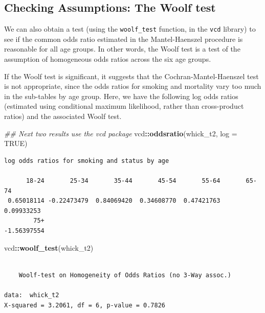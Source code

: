 \documentclass[
]{book}
\newenvironment{Shaded}{\begin{snugshade}}{\end{snugshade}}
\newcommand{\CommentTok}[1]{\textcolor[rgb]{0.56,0.35,0.01}{\textit{#1}}}
\newcommand{\DataTypeTok}[1]{\textcolor[rgb]{0.13,0.29,0.53}{#1}}
\newcommand{\KeywordTok}[1]{\textcolor[rgb]{0.13,0.29,0.53}{\textbf{#1}}}
\newcommand{\NormalTok}[1]{#1}
\newcommand{\OperatorTok}[1]{\textcolor[rgb]{0.81,0.36,0.00}{\textbf{#1}}}
\newcommand{\OtherTok}[1]{\textcolor[rgb]{0.56,0.35,0.01}{#1}}
\begin{document}
\hypertarget{checking-assumptions-the-woolf-test}{%
\subsection{Checking Assumptions: The Woolf test}\label{checking-assumptions-the-woolf-test}}

We can also obtain a test (using the \texttt{woolf\_test} function, in the \texttt{vcd} library) to see if the common odds ratio estimated in the Mantel-Haenszel procedure is reasonable for all age groups. In other words, the Woolf test is a test of the assumption of homogeneous odds ratios across the six age groups.

If the Woolf test is significant, it suggests that the Cochran-Mantel-Haenszel test is not appropriate, since the odds ratios for smoking and mortality vary too much in the sub-tables by age group. Here, we have the following log odds ratios (estimated using conditional maximum likelihood, rather than cross-product ratios) and the associated Woolf test.

\begin{Shaded}
\begin{Highlighting}[]
\CommentTok{## Next two results use the vcd package}
\NormalTok{vcd}\OperatorTok{::}\KeywordTok{oddsratio}\NormalTok{(whick_t2, }\DataTypeTok{log =} \OtherTok{TRUE}\NormalTok{)}
\end{Highlighting}
\end{Shaded}

\begin{verbatim}
log odds ratios for smoking and status by age 

      18-24       25-34       35-44       45-54       55-64       65-74 
 0.65018114 -0.22473479  0.84069420  0.34608770  0.47421763  0.09933253 
        75+ 
-1.56397554 
\end{verbatim}

\begin{Shaded}
\begin{Highlighting}[]
\NormalTok{vcd}\OperatorTok{::}\KeywordTok{woolf_test}\NormalTok{(whick_t2)}
\end{Highlighting}
\end{Shaded}

\begin{verbatim}

	Woolf-test on Homogeneity of Odds Ratios (no 3-Way assoc.)

data:  whick_t2
X-squared = 3.2061, df = 6, p-value = 0.7826
\end{verbatim}
\end{document}
